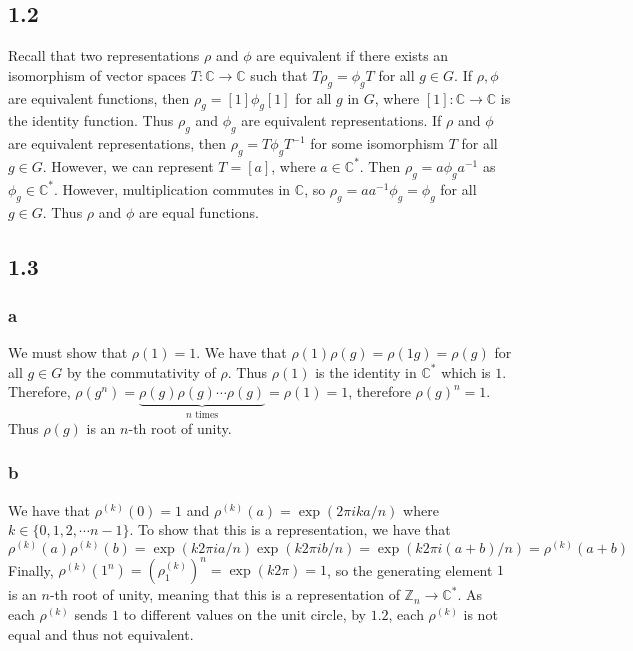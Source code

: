 \documentclass[]{article}
\begin{document}
\subsection*{1.2}
Recall that two representations $\rho$ and $\phi$ are equivalent if there exists an isomorphism of vector spaces $T: \mathbb{C} \rightarrow \mathbb{C}$ such that $T \rho_g = \phi_g T$ for all $g \in G$. 
If $\rho, \phi$ are equivalent functions, then $\rho_g = [1] \phi_g [1]$ for all $g$ in $G$, where $[1] : \mathbb{C} \rightarrow \mathbb{C}$ is the identity function. Thus $\rho_g$ and $\phi_g$ are equivalent representations.
If $\rho$ and $\phi$ are equivalent representations, then $\rho_g = T \phi_g T^{-1}$ for some isomorphism $T$ for all $g \in G$. However, we can represent $T = [a]$, where $ a \in \mathbb{C}^*$. Then $\rho_g = a \phi_g a^{-1}$ as $\phi_g \in \mathbb{C}^*$. However, multiplication commutes in $\mathbb{C}$, so $\rho_g = a a^{-1} \phi_g = \phi_g$ for all $g \in G$. Thus $\rho$ and $\phi$ are equal functions. 
\subsection{1.3}
\subsubsection*{a}
We must show that $\rho(1) = 1$. We have that $\rho(1) \rho(g) =\rho(1 g) =  \rho(g)$ for all $g \in G$ by the commutativity of $\rho$. Thus $\rho(1)$ is the identity in $\mathbb{C}^*$ which is $1$. Therefore, $\rho(g^n) = \underbrace{\rho(g) \rho(g) \cdots \rho(g)}_{n \text{ times}} = \rho(1) = 1$, therefore $\rho(g)^n = 1$. Thus $\rho(g)$ is an $n$-th root of unity. 
\subsubsection*{b}
We have that $\rho^{(k)}(0) = 1$ and $\rho^{(k)}(a) = \exp( 2\pi i ka/n)$ where $k \in \lbrace 0, 1, 2, \cdots n-1 \rbrace$.
To show that this is a representation, we have that 
\begin{equation}
	\rho^{(k)}(a) \rho^{(k)}(b)  = \exp(k 2\pi i a/n) \exp(k 2\pi i b/n) = \exp(k 2\pi i (a + b)/n) = \rho^{(k)}(a + b)
\end{equation}
Finally, $\rho^{(k)}(1^n)= (\rho^{(k)}_{1})^n = \exp(k 2 \pi) = 1$, so the generating element $1$ is an $n$-th root of unity, meaning that this is a representation of $\mathbb{Z}_n \rightarrow \mathbb{C}^*$.
As each $\rho^{(k)}$ sends $1$ to different values on the unit circle, by $1.2$, each $\rho^{(k)}$ is not equal and thus not equivalent. 
\end{document}
